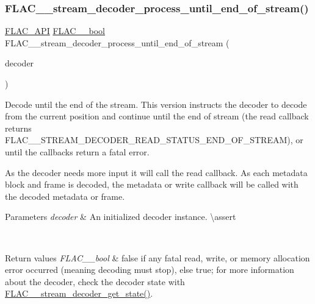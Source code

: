 \subsubsection{\texorpdfstring{FLAC\_\_stream\_decoder\_process\_until\_end\_of\_stream()}{FLAC\_\_stream\_decoder\_process\_until\_end\_of\_stream()}}
{\footnotesize\ttfamily \mbox{\hyperlink{group__flac__export_ga56ca07df8a23310707732b1c0007d6f5}{F\+L\+A\+C\+\_\+\+A\+PI}} \mbox{\hyperlink{ordinals_8h_a95103469f1cbd78b8cf250194985b34e}{F\+L\+A\+C\+\_\+\+\_\+bool}} F\+L\+A\+C\+\_\+\+\_\+stream\+\_\+decoder\+\_\+process\+\_\+until\+\_\+end\+\_\+of\+\_\+stream (\begin{DoxyParamCaption}\item[{\mbox{\hyperlink{struct_f_l_a_c_____stream_decoder}{F\+L\+A\+C\+\_\+\+\_\+\+Stream\+Decoder}} $\ast$}]{decoder }\end{DoxyParamCaption})}

Decode until the end of the stream. This version instructs the decoder to decode from the current position and continue until the end of stream (the read callback returns {\ttfamily F\+L\+A\+C\+\_\+\+\_\+\+S\+T\+R\+E\+A\+M\+\_\+\+D\+E\+C\+O\+D\+E\+R\+\_\+\+R\+E\+A\+D\+\_\+\+S\+T\+A\+T\+U\+S\+\_\+\+E\+N\+D\+\_\+\+O\+F\+\_\+\+S\+T\+R\+E\+AM}), or until the callbacks return a fatal error.

As the decoder needs more input it will call the read callback. As each metadata block and frame is decoded, the metadata or write callback will be called with the decoded metadata or frame.


\begin{DoxyParams}{Parameters}
{\em decoder} & An initialized decoder instance. \textbackslash{}assert 
\begin{DoxyCode}{1}
\end{DoxyCode}
 \\
\hline
\end{DoxyParams}

\begin{DoxyRetVals}{Return values}
{\em F\+L\+A\+C\+\_\+\+\_\+bool} & {\ttfamily false} if any fatal read, write, or memory allocation error occurred (meaning decoding must stop), else {\ttfamily true}; for more information about the decoder, check the decoder state with \mbox{\hyperlink{group__flac__stream__decoder_ga5899c204ad7183ec04e41855090c0635}{F\+L\+A\+C\+\_\+\+\_\+stream\+\_\+decoder\+\_\+get\+\_\+state()}}. \\
\hline
\end{DoxyRetVals}
\mbox{\label{group__flac__stream__decoder_ga2342cf4f3caf9ad20fca1373aaea0c27}} 
